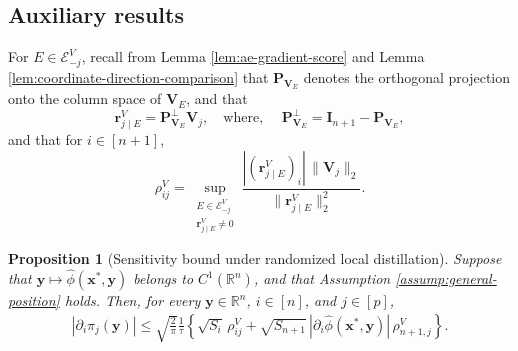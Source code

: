 \documentclass[12pt]{article}
\newtheorem{proposition}{Proposition}
\theoremstyle{definition}
\begin{document}
\subsection{Auxiliary results}
\label{App:stability:aux}


For $E\in\mathcal E_{-j}^V$, recall from Lemma \ref{lem:ae-gradient-score} and Lemma \ref{lem:coordinate-direction-comparison} that $\boldsymbol P_{\boldsymbol V_E}$ denotes the orthogonal projection onto the column space of $\boldsymbol V_E$, and that 
\[
    \boldsymbol r_{j\mid E}^V
    =
    \boldsymbol P_{\boldsymbol V_E}^{\perp}\boldsymbol V_j,
    \quad \text{where, } \quad 
    \boldsymbol P_{\boldsymbol V_E}^{\perp}
    =
    \boldsymbol I_{n+1}-\boldsymbol P_{\boldsymbol V_E},
\]
and that for $i \in [n+1]$,
\[
    \rho_{ij}^V
    =
    \sup_{\substack{
        E\in\mathcal E_{-j}^V\\
        \boldsymbol r_{j\mid E}^V\ne0
    }}
    \frac{
        |(\boldsymbol r_{j\mid E}^V)_i|\,\|\boldsymbol V_j\|_2
    }{
        \|\boldsymbol r_{j\mid E}^V\|_2^2
    }.
\]

\begin{proposition}[Sensitivity bound under randomized local distillation]
\label{thm:distillation-coordinate-stability}
Suppose that $\boldsymbol y\longmapsto\hat\phi(\bm{x}^*, \bm{y})$
belongs to $C^1(\mathbb R^n)$, and that Assumption {\ref{assump:general-position}} holds. Then, for every $\boldsymbol y\in\mathbb R^n$,
$i\in[n]$, and $j\in[p]$,
\begin{align*}
    |\partial_i\pi_j(\boldsymbol y)|
    \le
    \sqrt{\frac{2}{\pi}}\frac{1}{\tau}
    \left\{
        \sqrt{S_i}\,\rho_{ij}^V
        +
        \sqrt{S_{n+1}}\,
        |\partial_i\hat\phi(\bm{x}^*, \bm{y})|\,
        \rho_{n+1,j}^V
    \right\}.
\end{align*}
\end{proposition}
\end{document}
